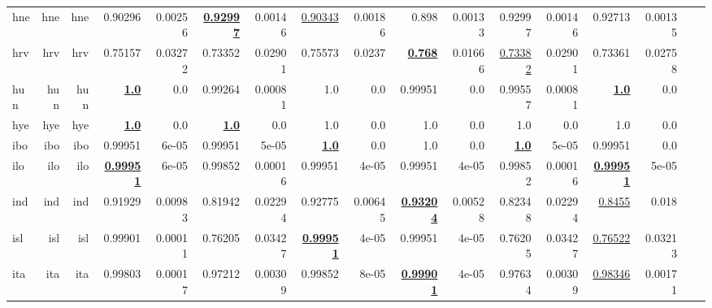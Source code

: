 \documentclass[11pt]{article}
\begin{document}
\begin{table*}[h]
{\begin{tabular}{lrrrrrrrrrrrrrrrr}
hne         & hne         & hne         & 0.90296         & 0.00256         & \textbf{\underline{0.92997}}         & 0.00146         & \underline{0.90343}         & 0.00186         & 0.898         & 0.00133         & 0.92997         & 0.00146         & 0.92713         & 0.00135         \\
hrv         & hrv         & hrv         & 0.75157         & 0.03272         & 0.73352         & 0.02901         & 0.75573         & 0.0237         & \textbf{\underline{0.768}}         & 0.01666         & \underline{0.73382}         & 0.02901         & 0.73361         & 0.02758         \\
hun         & hun         & hun         & \textbf{\underline{1.0}}         & 0.0         & 0.99264         & 0.00081         & 1.0         & 0.0         & 0.99951         & 0.0         & 0.99557         & 0.00081         & \textbf{\underline{1.0}}         & 0.0         \\
hye         & hye         & hye         & \textbf{\underline{1.0}}         & 0.0         & \textbf{\underline{1.0}}         & 0.0         & 1.0         & 0.0         & 1.0         & 0.0         & 1.0         & 0.0         & 1.0         & 0.0         \\
ibo         & ibo         & ibo         & 0.99951         & 6e-05         & 0.99951         & 5e-05         & \textbf{\underline{1.0}}         & 0.0         & 1.0         & 0.0         & \textbf{\underline{1.0}}         & 5e-05         & 0.99951         & 0.0         \\
ilo         & ilo         & ilo         & \textbf{\underline{0.99951}}         & 6e-05         & 0.99852         & 0.00016         & 0.99951         & 4e-05         & 0.99951         & 4e-05         & 0.99852         & 0.00016         & \textbf{\underline{0.99951}}         & 5e-05         \\
ind         & ind         & ind         & 0.91929         & 0.00983         & 0.81942         & 0.02294         & 0.92775         & 0.00645         & \textbf{\underline{0.93204}}         & 0.00528         & 0.82348         & 0.02294         & \underline{0.8455}         & 0.018         \\
isl         & isl         & isl         & 0.99901         & 0.00011         & 0.76205         & 0.03427         & \textbf{\underline{0.99951}}         & 4e-05         & 0.99951         & 4e-05         & 0.76205         & 0.03427         & \underline{0.76522}         & 0.03213         \\
ita         & ita         & ita         & 0.99803         & 0.00017         & 0.97212         & 0.00309         & 0.99852         & 8e-05         & \textbf{\underline{0.99901}}         & 4e-05         & 0.97634         & 0.00309         & \underline{0.98346}         & 0.00171         \\

\end{tabular}}
\end{table*}
\end{document}
